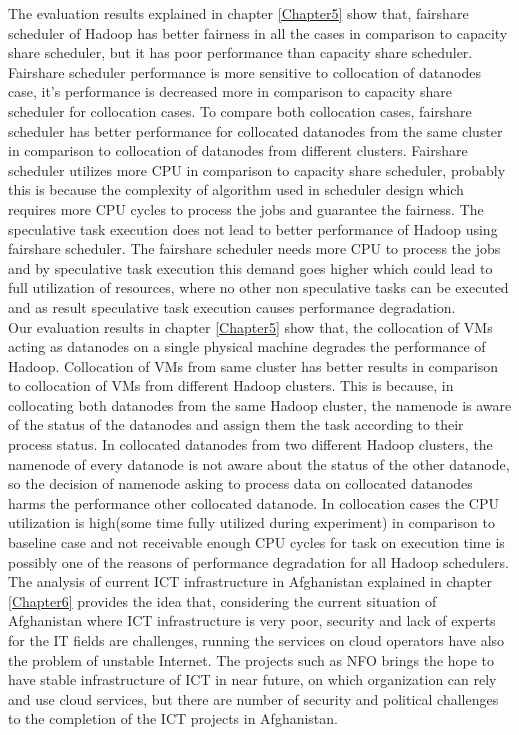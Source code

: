  The evaluation results explained in chapter \ref{Chapter5} show that, fairshare scheduler of Hadoop has better fairness in all the cases in comparison to capacity share scheduler, but it has poor performance than capacity share scheduler. Fairshare scheduler performance is more sensitive to collocation of datanodes case, it's performance is decreased more in comparison to capacity share scheduler for collocation cases. To compare both collocation cases, fairshare scheduler has better performance for collocated datanodes from the same cluster in comparison to collocation of datanodes from different clusters. Fairshare scheduler utilizes more CPU in comparison to capacity share scheduler, probably this is because the complexity of algorithm used in scheduler design which requires more CPU cycles to process the jobs and guarantee the fairness. The speculative task execution does not lead to better performance of Hadoop using fairshare scheduler. The fairshare scheduler needs more CPU to process the jobs and by speculative task execution this demand goes higher which could lead to full utilization of resources, where no other non speculative  tasks can be executed and as result speculative task execution causes performance degradation.   \\
 
 Our evaluation results in chapter \ref{Chapter5} show that, the collocation of VMs acting as datanodes on a single physical machine degrades the performance  of Hadoop. Collocation of VMs‌ from same cluster has better results in comparison to collocation of VMs from different Hadoop clusters. This is because, in collocating both datanodes from the same Hadoop cluster, the namenode is aware of the status of the datanodes and assign them the task according to their process status. In collocated datanodes from two different Hadoop clusters, the namenode of every datanode is not aware about the status of the other datanode, so the decision of namenode asking to process data on collocated datanodes harms the performance other collocated datanode.  In collocation cases the CPU utilization is high(some time fully utilized during experiment) in comparison to baseline case and not receivable enough CPU cycles for task on execution time is possibly one of the reasons of performance degradation for all Hadoop schedulers.\\
 
 
 
   The analysis of current ICT infrastructure in Afghanistan explained in chapter \ref{Chapter6} provides the idea that, considering the current situation of Afghanistan where ICT infrastructure is very poor, security and lack of experts for the IT‌ fields are challenges, running the services on cloud operators have also the problem of unstable Internet. The projects such as NFO‌ brings the hope to have stable infrastructure of ICT in near future, on which organization can rely and use cloud services, but there are number of security and political challenges to the completion of the ICT‌ projects in Afghanistan.  

